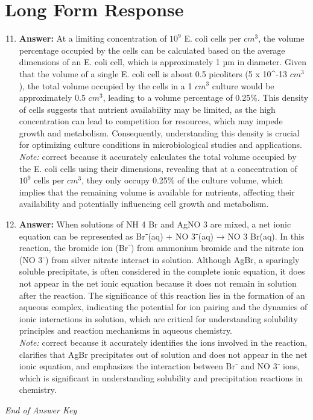 \documentclass[12pt]{article}
\begin{document}
\section*{Long Form Response}
\begin{enumerate}[label=\arabic*.]
\setcounter{enumi}{10}
\item \textbf{Answer:} At a limiting concentration of $10^9$ E. coli cells per $cm^3$, the volume percentage occupied by the cells can be calculated based on the average dimensions of an E. coli cell, which is approximately 1 µm in diameter. Given that the volume of a single E. coli cell is about 0.5 picoliters (5 x 10^-13 $cm^3$), the total volume occupied by the cells in a 1 $cm^3$ culture would be approximately 0.5 $cm^3$, leading to a volume percentage of 0.25\%. This density of cells suggests that nutrient availability may be limited, as the high concentration can lead to competition for resources, which may impede growth and metabolism. Consequently, understanding this density is crucial for optimizing culture conditions in microbiological studies and applications.
\\ \textit{Note:} correct because it accurately calculates the total volume occupied by the E. coli cells using their dimensions, revealing that at a concentration of $10^9$ cells per $cm^3$, they only occupy 0.25\% of the culture volume, which implies that the remaining volume is available for nutrients, affecting their availability and potentially influencing cell growth and metabolism.
\item \textbf{Answer:} When solutions of NH 4 Br and AgNO 3 are mixed, a net ionic equation can be represented as Br⁻(aq) + NO 3⁻(aq) → NO 3 Br(aq). In this reaction, the bromide ion (Br⁻) from ammonium bromide and the nitrate ion (NO 3⁻) from silver nitrate interact in solution. Although AgBr, a sparingly soluble precipitate, is often considered in the complete ionic equation, it does not appear in the net ionic equation because it does not remain in solution after the reaction. The significance of this reaction lies in the formation of an aqueous complex, indicating the potential for ion pairing and the dynamics of ionic interactions in solution, which are critical for understanding solubility principles and reaction mechanisms in aqueous chemistry.
\\ \textit{Note:} correct because it accurately identifies the ions involved in the reaction, clarifies that AgBr precipitates out of solution and does not appear in the net ionic equation, and emphasizes the interaction between Br⁻ and NO 3⁻ ions, which is significant in understanding solubility and precipitation reactions in chemistry.
\end{enumerate}

\vfill
\noindent\textit{End of Answer Key}
\end{document}
